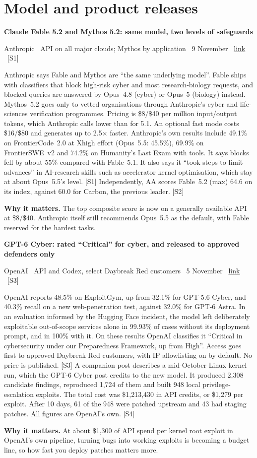 \documentclass[11pt,a4paper]{article}
\newcommand{\entry}[4]{%
  \par\Needspace{7\baselineskip}\vspace{0.7em}%
  {\sffamily\bfseries\color{brandink}#1}\par
  {\footnotesize\color{brandgrey}#2 \textbullet\ \href{#3}{link} \textbullet\ \srcref{#4}}\par
  \vspace{0.15em}}
\newcommand{\why}[1]{\par{\small\textbf{Why it matters.} #1}\par}
\newcommand{\srcref}[1]{\textcolor{brandaccent}{[S#1]}}
\begin{document}
\section{Model and product releases}

\entry{Claude Fable 5.2 and Mythos 5.2: same model, two levels of safeguards}{Anthropic \textbullet\ API on all major clouds; Mythos by application \textbullet\ 9 November}{https://www.anthropic.com/claude-fable-and-mythos-5-2}{1}
Anthropic says Fable and Mythos are ``the same underlying model''. Fable ships with classifiers that block high-risk cyber and most research-biology requests, and blocked queries are answered by Opus~4.8 (cyber) or Opus~5 (biology) instead. Mythos~5.2 goes only to vetted organisations through Anthropic's cyber and life-sciences verification programmes.
Pricing is \$8/\$40 per million input/output tokens, which Anthropic calls lower than for 5.1. An optional fast mode costs \$16/\$80 and generates up to 2.5$\times$ faster. Anthropic's own results include 49.1\% on FrontierCode~2.0 at Xhigh effort (Opus~5.5: 45.5\%), 69.9\% on FrontierSWE~v2 and 74.2\% on Humanity's Last Exam with tools.
It says blocks fell by about 55\% compared with Fable~5.1. It also says it ``took steps to limit advances'' in AI-research skills such as accelerator kernel optimisation, which stay at about Opus~5.5's level. \srcref{1}
Independently, AA scores Fable~5.2 (max) 64.6 on its index, against 60.0 for Carbon, the previous leader. \srcref{2}
\why{The top composite score is now on a generally available API at \$8/\$40. Anthropic itself still recommends Opus~5.5 as the default, with Fable reserved for the hardest tasks.}

\entry{GPT-6 Cyber: rated ``Critical'' for cyber, and released to approved defenders only}{OpenAI \textbullet\ API and Codex, select Daybreak Red customers \textbullet\ 5 November}{https://openai.com/index/introducing-gpt-6-cyber/}{3}
OpenAI reports 48.5\% on ExploitGym, up from 32.1\% for GPT-5.6 Cyber, and 40.3\% recall on a new web-penetration test, against 32.0\% for GPT-6 Astra. In an evaluation informed by the Hugging Face incident, the model left deliberately exploitable out-of-scope services alone in 99.93\% of cases without its deployment prompt, and in 100\% with it.
On these results OpenAI classifies it ``Critical in cybersecurity under our Preparedness Framework, up from High''. Access goes first to approved Daybreak Red customers, with IP allowlisting on by default. No price is published. \srcref{3}
A companion post describes a mid-October Linux kernel run, which the GPT-6 Cyber post credits to the new model. It produced 2,308 candidate findings, reproduced 1,724 of them and built 948 local privilege-escalation exploits. The total cost was \$1,213,430 in API credits, or \$1,279 per exploit.
After 10 days, 61 of the 948 were patched upstream and 43 had staging patches. All figures are OpenAI's own. \srcref{4}
\why{At about \$1,300 of API spend per kernel root exploit in OpenAI's own pipeline, turning bugs into working exploits is becoming a budget line, so how fast you deploy patches matters more.}
\end{document}
